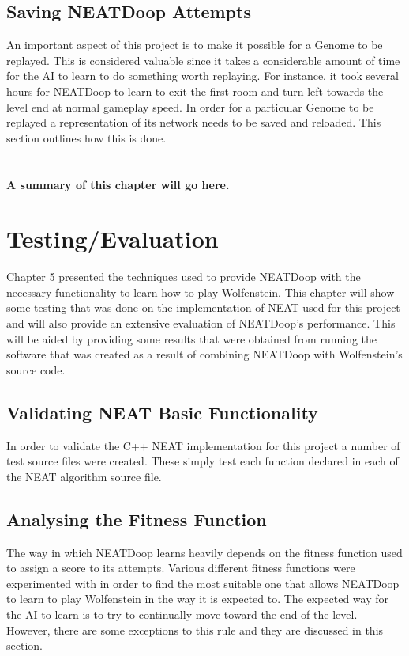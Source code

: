 \documentclass[]{Learning-to-Play-Wolfenstein-thesis}
\begin{document}
\section{Saving NEATDoop Attempts}
An important aspect of this project is to make it possible for a Genome to be replayed. This is considered valuable since it takes a considerable amount of time for the AI to learn to do something worth replaying. For instance, it took several hours for NEATDoop to learn to exit the first room and turn left towards the level end at normal gameplay speed. In order for a particular Genome to be replayed a representation of its network needs to be saved and reloaded. This section outlines how this is done.\\\\\\\textbf{A summary of this chapter will go here.}


\chapter{Testing/Evaluation}%
Chapter 5 presented the techniques used to provide NEATDoop with the necessary functionality to learn how to play Wolfenstein. This chapter will show some testing that was done on the implementation of NEAT used for this project and will also provide an extensive evaluation of NEATDoop's performance. This will be aided by providing some results that were obtained from running the software that was created as a result of combining NEATDoop with Wolfenstein's source code.

\section{Validating NEAT Basic Functionality}
In order to validate the C++ NEAT implementation for this project a number of test source files were created. These simply test each function declared in each of the NEAT algorithm source file.

\section{Analysing the Fitness Function}
The way in which NEATDoop learns heavily depends on the fitness function used to assign a score to its attempts. Various different fitness functions were experimented with in order to find the most suitable one that allows NEATDoop to learn to play Wolfenstein in the way it is expected to. The expected way for the AI to learn is to try to continually move toward the end of the level. However, there are some exceptions to this rule and they are discussed in this section.
\end{document}
